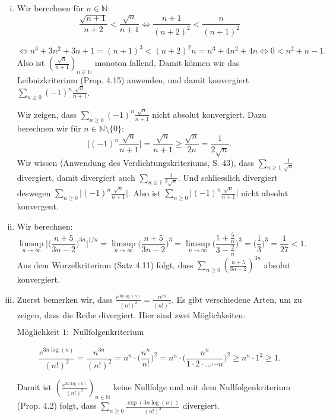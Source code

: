 \documentclass[a4paper, 20]{exam}
\newcommand\NN{\mathbb{N}}
\begin{document}
\begin{solution}
\begin{enumerate}[i.)]
\item
Wir berechnen f\"ur $n\in \NN$:
$$ \frac{\sqrt{n+1}}{n+2} < \frac{\sqrt{n}}{n+1} 
\Longleftrightarrow \frac{n+1}{(n+2)^2} < \frac{n}{(n+1)^2}$$

$$\Longleftrightarrow n^3+3n^2+3n+1= (n+1)^3 < (n+2)^2 n = n^3+4n^2+4n
\Longleftrightarrow 0 < n^2+n-1.$$
Also ist $(\frac{\sqrt{n}}{n+1})_{n \in \NN}$ monoton fallend. Damit k\"onnen wir das Leibnizkriterium (Prop. 4.15) anwenden, und damit konvergiert $ \sum_{n\geq 0} (-1)^n \frac{\sqrt{n}}{n+1}$.

Wir zeigen, dass $ \sum_{n\geq 0} (-1)^n \frac{\sqrt{n}}{n+1}$ nicht absolut konvergiert. Dazu berechnen wir f\"ur $n \in \NN \setminus \{0\}$:
$$ \bigg\vert (-1)^n \frac{\sqrt{n}}{n+1} \bigg\vert = \frac{\sqrt{n}}{n+1}
\geq \frac{\sqrt{n}}{2n} = \frac{1}{2\sqrt{n}}.$$
Wir wissen (Anwendung des Verdichtungskriteriums, S. 43), dass $\sum_{n\geq 1} \frac{1}{\sqrt{n}}$ divergiert, damit divergiert auch $\sum_{n\geq 1} \frac{1}{2\sqrt{n}}$. Und schliesslich divergiert deswegen 
$\sum_{n\geq 0} \bigg\vert (-1)^n \frac{\sqrt{n}}{n+1} \bigg\vert$. Also ist $\sum_{n\geq 0} \bigg\vert (-1)^n \frac{\sqrt{n}}{n+1} \bigg\vert$ nicht absolut konvergent.
\item
Wir berechnen:
$$ \limsup_{n\rightarrow \infty} \bigg\vert \Big( \frac{n+5}{3n-2} \Big)^{3n} \bigg\vert^{1/n} 
= \limsup_{n\rightarrow \infty} \bigg( \frac{n+5}{3n-2} \bigg)^{3}
= \limsup_{n\rightarrow \infty} \bigg( \frac{1+\frac{5}{n}}{3-\frac{2}{n}} \bigg)^{3} = \bigg(\frac{1}{3} \bigg)^3= \frac{1}{27} <1.$$
Aus dem Wurzelkriterium (Satz 4.11) folgt, dass $\sum_{n\geq 0} \left( \frac{n+5}{3n-2} \right)^{3n}$ absolut konvergiert.
\item
Zuerst bemerken wir, dass $\frac{e^{3n \log(n)}}{(n!)^2}= \frac{n^{3n}}{(n!)^2}$. Es gibt verschiedene Arten, um zu zeigen, dass die Reihe divergiert. Hier sind zwei M\"oglichkeiten:

$\underline{\text{M\"oglichkeit }1: \text{ Nullfolgenkriterium}}$ 

$$\frac{e^{3n \log(n)}}{(n!)^2}= \frac{n^{3n}}{(n!)^2}
= n^n \cdot \bigg(\frac{n^n}{n!}\bigg)^2 
= n^n \cdot \bigg(\frac{n^n}{1 \cdot 2 \cdot \dots \cdots n}\bigg)^2
\geq n^n \cdot 1^2 \geq 1.$$

Damit ist $(\frac{e^{3n \log(n)}}{(n!)^2})_{n \in \NN}$ keine Nullfolge und mit dem Nullfolgenkriterium (Prop. 4.2) folgt, dass $\sum_{n\geq 0} \frac{\exp(3n \log(n))}{(n!)^2}$ divergiert.


\end{enumerate}
\end{solution}
\end{document}
